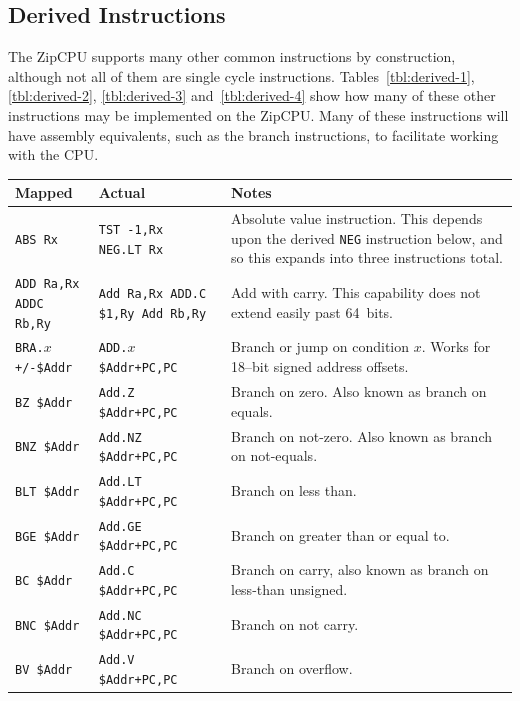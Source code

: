 \documentclass{gqtekspec}
\begin{document}
\subsection{Derived Instructions}
The ZipCPU supports many other common instructions by construction, although
not all of them are single cycle instructions.  Tables~\ref{tbl:derived-1},
\ref{tbl:derived-2}, \ref{tbl:derived-3} and~\ref{tbl:derived-4} show how
many of these other instructions may be implemented on the ZipCPU.  Many of
these instructions will have assembly equivalents, such as the branch
instructions, to facilitate working with the CPU.
\begin{table}\begin{center}
\begin{tabular}{p{1.0in}p{1.5in}p{3in}}\\\hline
Mapped & Actual  & Notes \\\hline
{\tt ABS Rx}
	& \parbox[t]{1.5in}{\tt TST -1,Rx\\NEG.LT Rx}
	& Absolute value instruction.  This depends upon the derived
	{\tt NEG} instruction below, and so this expands into three
	instructions total.\\\hline
\parbox[t]{1.4in}{\tt ADD Ra,Rx\\ADDC Rb,Ry}
	& \parbox[t]{1.5in}{\tt Add Ra,Rx\\ADD.C \$1,Ry\\Add Rb,Ry}
	& Add with carry.  This capability does not extend easily past 64~bits.
	\\\hline
\hbox{\tt BRA.$x$ +/-\$Addr}
	& \hbox{\tt ADD.$x$ \$Addr+PC,PC}
	& Branch or jump on condition $x$.  Works for 18--bit
		signed address offsets.\\\hline
\hbox{\tt BZ \$Addr}
	& \hbox{\tt Add.Z \$Addr+PC,PC}
	& Branch on zero.  Also known as branch on equals.\\\hline
\hbox{\tt BNZ \$Addr}
	& \hbox{\tt Add.NZ \$Addr+PC,PC}
	& Branch on not-zero.  Also known as branch on not-equals.\\\hline
\hbox{\tt BLT \$Addr}
	& \hbox{\tt Add.LT \$Addr+PC,PC}
	& Branch on less than.\\\hline
\hbox{\tt BGE \$Addr}
	& \hbox{\tt Add.GE \$Addr+PC,PC}
	& Branch on greater than or equal to.\\\hline
\hbox{\tt BC \$Addr}
	& \hbox{\tt Add.C \$Addr+PC,PC}
	& Branch on carry, also known as branch on less-than unsigned.\\\hline
\hbox{\tt BNC \$Addr}
	& \hbox{\tt Add.NC \$Addr+PC,PC}
	& Branch on not carry.\\\hline
\hbox{\tt BV \$Addr}
	& \hbox{\tt Add.V \$Addr+PC,PC}
	& Branch on overflow.\\\hline


\end{tabular}
\end{center}
\end{table}
\end{document}
